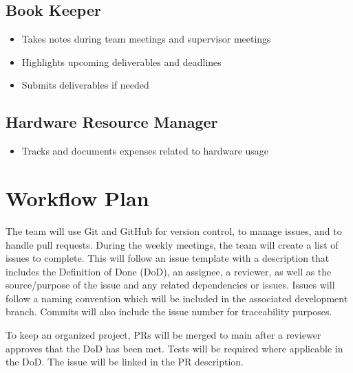 \documentclass{article}
\begin{document}
\subsection{Book Keeper}

\begin{itemize}
  \item Takes notes during team meetings and supervisor meetings
  \item Highlights upcoming deliverables and deadlines
  \item Submits deliverables if needed
\end{itemize}

\subsection{Hardware Resource Manager }

\begin{itemize}
  \item Tracks and documents expenses related to hardware usage
\end{itemize}


\section{Workflow Plan}

  \begin{comment}
	\item How will you be using git, including branches, pull request, etc.?
	\item How will you be managing issues, including template issues, issue
	classification, etc.?
  \item Use of CI/CD
  \item 
\end{comment}
  
The team will use Git and GitHub for version control, to manage issues, and to handle pull requests. During the weekly meetings, the team will create a list of issues to complete. This will follow an issue template with a description that includes the Definition of Done (DoD), an assignee, a reviewer, as well as the source/purpose of the issue and any related dependencies or issues. Issues will follow a naming convention which will be included in the associated development branch. Commits will also include the issue number for traceability purposes.

\noindent To keep an organized project, PRs will be merged to main after a reviewer approves that the DoD has been met. Tests will be required where applicable in the DoD. The issue will be linked in the PR description.
\end{document}

